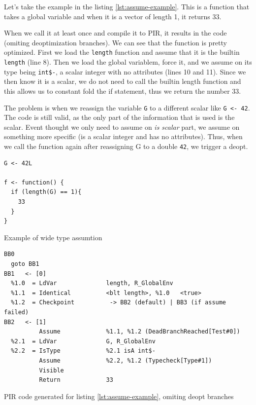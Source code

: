 Let's take the example in the listing \ref{lst:assume-example}. This is a function that takes a global variable and when it is a vector of length 1, it returns 33.

When we call it at least once and compile it to PIR, it results in the code \todoadd (omiting deoptimization branches). We can see that the function is pretty optimized. First we load the \texttt{length} function and assume that it is the builtin \texttt{length} (line 8). Then we load the global variablem, force it, and we assume on its type being \texttt{int\$-}, a scalar integer with no attributes (lines 10 and 11). Since we then know it is a scalar, we do not need to call the builtin length function and this allows us to constant fold the if statement, thus we return the number 33.

The problem is when we reassign the variable \texttt{G} to a different scalar like \texttt{G <- 42}. The code is still valid, as the only part of the information that is used is the scalar. Event thought we only need to assume on \textit{is scalar} part, we assume on something more specific (is a scalar integer and has no attributes). Thus, when we call the function again after reassigning G to a double \texttt{42}, we trigger a deopt.

\begin{listing}
	\begin{verbatim}
G <- 42L

f <- function() {
  if (length(G) == 1){
    33
  }
}
  \end{verbatim}
	\caption{Example of wide type assumtion}\label{lst:assume-example}
\end{listing}

\begin{listing}
	\begin{verbatim}
BB0
  goto BB1
BB1   <- [0]
  %1.0  = LdVar              length, R_GlobalEnv
  %1.1  = Identical          <blt length>, %1.0   <true>
  %1.2  = Checkpoint          -> BB2 (default) | BB3 (if assume failed)
BB2   <- [1]
          Assume             %1.1, %1.2 (DeadBranchReached[Test#0])
  %2.1  = LdVar              G, R_GlobalEnv
  %2.2  = IsType             %2.1 isA int$-
          Assume             %2.2, %1.2 (Typecheck[Type#1])
          Visible
          Return             33
  \end{verbatim}
	\caption{PIR code generated for listing \ref{lst:assume-example}, omiting deopt branches}\label{lst:assume-example-pir}
\end{listing}


